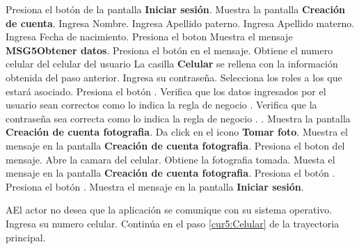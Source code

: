  \begin{UCtrayectoria}
 	
	 \UCpaso [\UCactor] Presiona el botón  de la pantalla \textbf{Iniciar sesión}.
	 \UCpaso Muestra la pantalla \textbf{Creación de cuenta}.
	 \UCpaso [\UCactor] Ingresa Nombre.
	 \UCpaso [\UCactor] Ingresa Apellido paterno.
	 \UCpaso [\UCactor] Ingresa Apellido materno.
	 \UCpaso [\UCactor] Ingresa Fecha de nacimiento.
	 \UCpaso [\UCactor] Presiona el boton  
	 \UCpaso Muestra el mensaje \textbf{MSG5{Obtener datos}}.
	 \UCpaso [\UCactor] Presiona el botón  en el mensaje.
	 \UCpaso Obtiene el numero celular del celular del usuario
	 \UCpaso La casilla \textbf{Celular} se rellena con la información obtenida del paso anterior.
	 \UCpaso [\UCactor] Ingresa su contraseña.\label{cur5:Celular}
	 \UCpaso [\UCactor] Selecciona los roles a los que estará asociado.
	 \UCpaso [\UCactor] Presiona el botón . \label{cur3:Doctor}
	 \UCpaso Verifica que los datos ingresados por el usuario sean correctos como lo indica la regla de negocio . 
	 \UCpaso Verifica que la contraseña sea correcta como lo indica la regla de negocio . .
	 \UCpaso Muestra la pantalla \textbf{Creación de cuenta fotografia}.
	 \UCpaso [\UCactor] Da click en el icono \textbf{Tomar foto}. 
	 \UCpaso Muestra el mensaje  en la pantalla \textbf{Creación de cuenta fotografia}.
	 \UCpaso [\UCactor] Presiona el boton  del mensaje.
	 \UCpaso Abre la camara del celular.
	 \UCpaso Obtiene la fotografia tomada.
	 \UCpaso Muesta el mensaje  en la pantalla \textbf{Creación de cuenta fotografia}.
	 \UCpaso [\UCactor] Presiona el botón .
	 \UCpaso [\UCactor] Presiona el botón .\label{cur3:foto}
	 \UCpaso Muestra el mensaje  en la pantalla \textbf{Iniciar sesión}.
	 

 \end{UCtrayectoria}

 \begin{UCtrayectoriaA}{A}{El actor no desea que la aplicación se comunique con su sistema operativo.}
 	\UCpaso [\UCactor] Ingresa su numero celular.
 	Continúa en el paso \ref{cur5:Celular} de la trayectoria principal.
    
 \end{UCtrayectoriaA}
 
